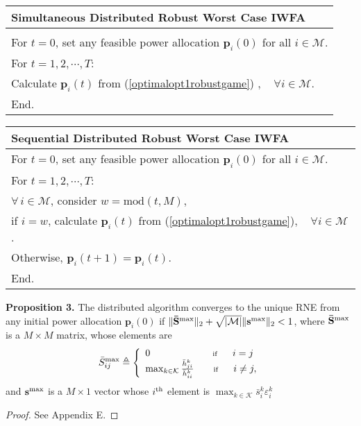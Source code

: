 \documentclass[peerreview,onecolumn,11pt,draftclsnofoot]{IEEEtran}\usepackage{amsmath}\usepackage{amsfonts}\usepackage{epsfig}\usepackage{amssymb}\usepackage{graphicx}\usepackage{amssymb,amsmath}\usepackage{cite}\usepackage{color,soul}\newcommand\T{\rule{0pt}{3.1ex}}
\begin{document}
\begin{table}[h]
\begin{tabular}{l}
\textbf{\quad\quad\quad Simultaneous Distributed Robust Worst Case IWFA}\\
\hline
\\\quad\quad For $t=0$, set any feasible power allocation $\textbf{p}_i(0) $ for all $i \in \mathcal{M}$.
\\ \quad \quad\quad  For $t=1,2,\cdots,T$:   \\ \quad\quad\quad\quad\quad
Calculate $\textbf{p}_i(t) $ from (\ref{optimalopt1robustgame}) ,
\,\,\, $\forall i \in  \mathcal{M}$.
\\\quad  \quad\quad End. \\[1ex]
\hline
\end{tabular}
\end{table}
\begin{table}[h]
\begin{tabular}{l}
\textbf{\quad\quad\quad Sequential Distributed Robust Worst Case IWFA}\\
\hline
\quad\quad For $t=0$, set any feasible power allocation $\textbf{p}_i(0) $ for all $i \in \mathcal{M}$.\\
\quad \quad\quad  For $t=1,2,\cdots,T$:   \\
\quad \quad\quad  $\forall \,i \in \mathcal{M}$, consider $w=\text{mod} (t,M)$, \\
\quad\quad\quad\quad\quad if $i=w$, calculate $\textbf{p}_i(t) $ from
(\ref{optimalopt1robustgame}), \,\,\, $\forall i \in
\mathcal{M}$. \\
\quad\quad\quad\quad\quad Otherwise, $\textbf{p}_i(t+1)=
\textbf{p}_i(t)$.
\\\quad  \quad\quad End. \\[1ex] \hline
\end{tabular}
\end{table}

\textbf{Proposition 3.} The distributed algorithm converges to the unique RNE from any initial power allocation $\textbf{p}_i(0)$ if
$\|\mathbf{\bar{S}}^{\scriptsize{\textnormal{max}}}\|_{2}+\sqrt{|\mathcal{M}|}\|\mathbf{s}^{\scriptsize{\textnormal{max}}}\|_{2}
< 1$,
where $\mathbf{\bar{S}}^{\scriptsize{\textnormal{max}}}$ is a $M \times M$ matrix, whose elements are
\begin{eqnarray}\label{TT}
 \bar{S}_{ij}^{\scriptsize{\textnormal{max}}} \triangleq  \left\{\begin{array}{l l}
0 \qquad\qquad\qquad\,\; \scriptsize{\textnormal{if}}\qquad i=j \\
 \max_{k \in \mathcal{K}}\frac{\bar{h}^{k}_{ji}}{\bar{h}^{k}_{ii}} \qquad \scriptsize{\textnormal{if}} \qquad i\neq j, \end{array} \right.
 \end{eqnarray}
 and $\mathbf{s}^{\scriptsize{\textnormal{max}}}$ is a $M \times 1$ vector whose $i^{\scriptsize{\textnormal{th}}}$ element is $\max_{k \in \mathcal{K}} \bar{s}_{i}^{k}\varepsilon_{i}^{k} $
\begin{proof}
See Appendix E.
\end{proof}
\end{document}
